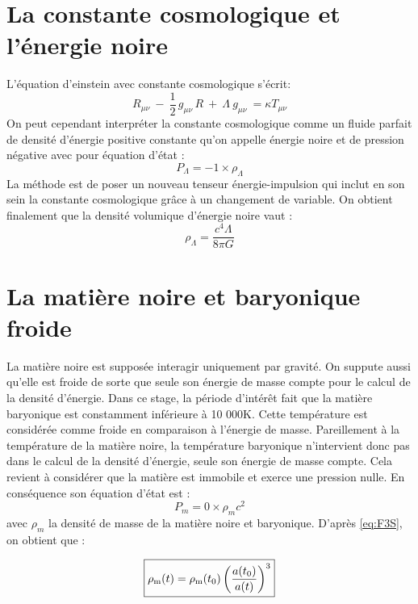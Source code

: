 \documentclass[10pt, a4paper]{report}
\numberwithin{equation}{subsection}
\begin{document}
\section{La constante cosmologique et l'énergie noire}
L'équation d'einstein avec constante cosmologique s'écrit:
\begin{equation} \label{eq:EFEL}
\boxed{R_{\mu \nu} \ - \ \frac{1}{2} \, g_{\mu \nu} \, R  \ + \ \Lambda \ g_{\mu \nu} \ =  \kappa T_{\mu \nu}}
\end{equation}
On peut cependant interpréter la constante cosmologique comme un fluide parfait de densité d'énergie positive constante qu'on appelle énergie noire et de pression négative avec pour équation d'état :
\begin{equation} \label{eq:EEL}
\boxed{P_\Lambda=-1 \times \rho_\Lambda}
\end{equation}
La méthode est de poser un nouveau tenseur énergie-impulsion qui inclut en son sein la constante cosmologique grâce à un changement de variable. On obtient finalement que la densité volumique d'énergie noire vaut :
\begin{equation} \label{eq:DEL}
\boxed{\rho_{\Lambda}  =  \frac{c^4 \Lambda}{8\pi G}}
\end{equation}

\section{La matière noire et baryonique froide}
La matière noire est supposée interagir uniquement par gravité. On suppute aussi qu'elle est froide de sorte que seule son énergie de masse compte pour le calcul de la densité d'énergie. 
Dans ce stage, la période d'intérêt fait que la matière baryonique est constamment inférieure à 10 000K. Cette température est considérée comme froide en comparaison à l'énergie de masse. Pareillement à la température de la matière noire, la température baryonique n'intervient donc pas dans le calcul de la densité d'énergie, seule son énergie de masse compte. Cela revient à considérer que la matière est immobile et exerce une pression nulle.
En conséquence son équation d'état est :
\begin{equation} \label{eq:EEM}
\boxed{P_m=0 \times \rho_m c^2}
\end{equation}
avec $\rho_m$ la densité de masse de la matière noire et baryonique.
D'après \ref{eq:F3S}, on obtient que :

\begin{equation} \label{eq:DEM}
\boxed{\rho_{\rm m}(t) = \rho_{\rm m}(t_0) \left(\frac{a(t_0)}{a(t)}\right)^3}
\end{equation}
\end{document}
